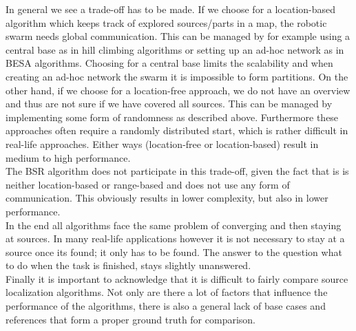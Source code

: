   In general we see a trade-off has to be made.
  If we choose for a location-based algorithm which keeps track of explored sources/parts in a map, the robotic swarm needs global communication.
  This can be managed by for example using a central base as in hill climbing algorithms or setting up an ad-hoc network as in BESA algorithms.
  Choosing for a central base limits the scalability and when creating an ad-hoc network the swarm it is impossible to form partitions.
  On the other hand, if we choose for a location-free approach, we do not have an overview and thus are not sure if we have covered all sources.
  This can be managed by implementing some form of randomness as described above.
  Furthermore these approaches often require a randomly distributed start, which is rather difficult in real-life approaches.
  Either ways (location-free or location-based) result in medium to high performance.\\

  The BSR algorithm does not participate in this trade-off, given the fact that is is neither location-based or range-based and does not use any form of communication. This obviously results in lower complexity, but also in lower performance. \\

  In the end all algorithms face the same problem of converging and then staying at sources. In many real-life applications however it is not necessary to stay at a source once its found; it only has to be found. The answer to the question what to do when the task is finished, stays slightly unanswered.\\

  Finally it is important to acknowledge that it is difficult to fairly compare source localization algorithms. Not only are there a lot of factors that influence the performance of the algorithms, there is also a general lack of base cases and references that form a proper ground truth for comparison.
